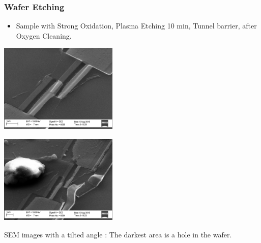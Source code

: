 \documentclass[handout]{beamer}
\begin{document}
    \begin{frame}
        \frametitle{Wafer Etching}
        \begin{itemize}
            \item Sample with Strong Oxidation, Plasma Etching 10 min, Tunnel barrier, after Oxygen Cleaning.
        \end{itemize}
        \begin{multicols}{2}
             \centering\includegraphics[width=160pt]{tilt3.png}
             
             \centering\includegraphics[width=160pt]{tilt4.png}
        \end{multicols}
       SEM images with a tilted angle : The darkest area is a hole in the wafer.
            
    \end{frame}
    
\end{document}
